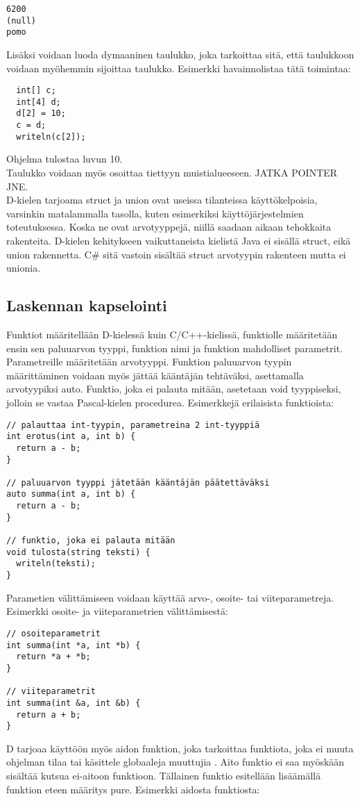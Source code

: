 \documentclass[11pt,oneside,a4paper]{article}
\begin{document}
\begin{verbatim}
6200
(null)
pomo
\end{verbatim}

Lisäksi voidaan luoda dymaaninen taulukko, joka tarkoittaa sitä, että taulukkoon voidaan myöhemmin sijoittaa taulukko. Esimerkki havainnolistaa tätä toimintaa:

\begin{verbatim}
  int[] c;
  int[4] d;
  d[2] = 10;
  c = d;
  writeln(c[2]);
\end{verbatim}
Ohjelma tulostaa luvun 10. \\
Taulukko voidaan myös osoittaa tiettyyn muistialueeseen. JATKA POINTER JNE. \\


D-kielen tarjoama struct ja union ovat useissa tilanteissa käyttökelpoisia, varsinkin matalammalla tasolla, kuten esimerkiksi käyttöjärjestelmien toteutuksessa. Koska ne ovat arvotyyppejä, niillä saadaan aikaan tehokkaita rakenteita. D-kielen kehitykseen vaikuttaneista kielistä Java ei sisällä struct, eikä union rakennetta. C\# sitä vastoin sisältää struct arvotyypin rakenteen mutta ei unionia.

\subsection{Laskennan kapselointi}

Funktiot määritellään D-kielessä kuin C/C++-kielissä, funktiolle määritetään ensin sen paluuarvon tyyppi, funktion nimi ja funktion mahdolliset parametrit. Parametreille määritetään arvotyyppi. Funktion paluuarvon tyypin määrittäminen voidaan myös jättää kääntäjän tehtäväksi, asettamalla arvotyypiksi auto. Funktio, joka ei palauta mitään, asetetaan void tyyppiseksi, jolloin se vastaa Pascal-kielen procedurea. Esimerkkejä erilaisista funktioista:

\begin{verbatim}
// palauttaa int-tyypin, parametreina 2 int-tyyppiä
int erotus(int a, int b) {
  return a - b;
}

// paluuarvon tyyppi jätetään kääntäjän päätettäväksi
auto summa(int a, int b) {
  return a - b;
}

// funktio, joka ei palauta mitään
void tulosta(string teksti) {
  writeln(teksti);
}
\end{verbatim}

Parametien välittämiseen voidaan käyttää arvo-, osoite- tai viiteparametreja. Esimerkki osoite- ja viiteparametrien välittämisestä:
\begin{verbatim}
// osoiteparametrit
int summa(int *a, int *b) {
  return *a + *b;
}

// viiteparametrit
int summa(int &a, int &b) {
  return a + b;
}
\end{verbatim} 
D tarjoaa käyttöön myös aidon funktion, joka tarkoittaa funktiota, joka ei muuta ohjelman tilaa tai käsittele globaaleja muuttujia \cite{DLA13}. Aito funktio ei saa myöskään sisältää kutsua ei-aitoon funktioon. Tällainen funktio esitellään lisäämällä funktion eteen määritys pure. Esimerkki aidosta funktiosta:
\end{document}
